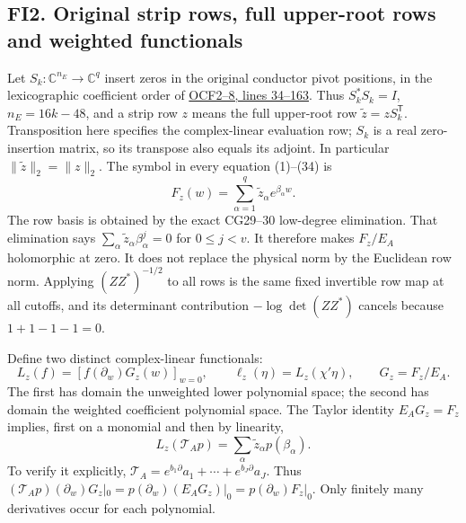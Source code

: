 \documentclass[11pt]{article}
\begin{document}
\subsection{FI2. Original strip rows, full upper-root rows and weighted functionals}\label{fi2.-original-strip-rows-full-upper-root-rows-and-weighted-functionals}

Let \(S_k:\mathbb C^{n_E}\to\mathbb C^q\) insert zeros in the original conductor pivot positions, in the lexicographic coefficient order of \href{https://github.com/KokunoYumeto/zeta-function-research-reader/blob/5992ad50c0f2a06921f1fcaded7b4e38097c0739/workbenches/splitzero-tandem/continuations/20260920-original-kernel-mixed-determinants/providers/ORIGINAL_CONDUCTOR_STRIP_FRAME.tex\#L34}{OCF2--8, lines 34--163}. Thus \(S_k^*S_k=I\), \(n_E=16k-48\), and a strip row \(z\) means the full upper-root row \(\widetilde z=zS_k^{\mathsf T}\). Transposition here specifies the complex-linear evaluation row; \(S_k\) is a real zero-insertion matrix, so its transpose also equals its adjoint. In particular \(\|\widetilde z\|_2=\|z\|_2\). The symbol in every equation (1)--(34) is \[
 F_z(w)=\sum_{\alpha=1}^q\widetilde z_\alpha e^{\beta_\alpha w}.
 \tag{FI5}
\] The row basis is obtained by the exact CG29--30 low-degree elimination. That elimination says \(\sum_\alpha\widetilde z_\alpha\beta_\alpha^j=0\) for \(0\le j<v\). It therefore makes \(F_z/E_A\) holomorphic at zero. It does not replace the physical norm by the Euclidean row norm. Applying \((ZZ^*)^{-1/2}\) to all rows is the same fixed invertible row map at all cutoffs, and its determinant contribution \(-\log\det(ZZ^*)\) cancels because \(1+1-1-1=0\).

Define two distinct complex-linear functionals: \[
 L_z(f)=[f(\partial_w)G_z(w)]_{w=0},\qquad
 \ell_z(\eta)=L_z(\chi'\eta),\qquad G_z=F_z/E_A.
 \tag{FI6}
\] The first has domain the unweighted lower polynomial space; the second has domain the weighted coefficient polynomial space. The Taylor identity \(E_AG_z=F_z\) implies, first on a monomial and then by linearity, \[
 L_z(\mathcal T_Ap)=\sum_\alpha\widetilde z_\alpha p(\beta_\alpha).
 \tag{FI7}
\] To verify it explicitly, \(\mathcal T_A=e^{b_1\partial}a_1+\cdots+e^{b_J\partial}a_J\). Thus \((\mathcal T_Ap)(\partial_w)G_z|_0=p(\partial_w)(E_AG_z)|_0=p(\partial_w)F_z|_0\). Only finitely many derivatives occur for each polynomial.
\end{document}
